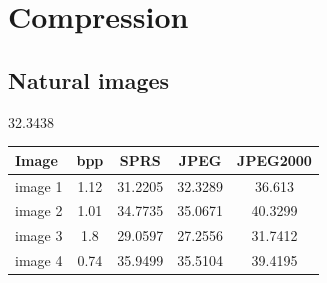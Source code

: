 \newpage
\section{Compression}
\subsection{Natural images}


32.3438

\begin{table}[H]
\centering
\begin{tabular}{| l c | c | c | c|}
\hline\hline
Image & bpp & SPRS & JPEG & JPEG2000 \\
\hline
image 1 & 1.12 & 31.2205 & 32.3289 & 36.613 \\
image 2 & 1.01 & 34.7735 & 35.0671 & 40.3299 \\
image 3 & 1.8  & 29.0597 & 27.2556 & 31.7412 \\
image 4 & 0.74  & 35.9499 & 35.5104 & 39.4195 \\

\hline
\end{tabular}
\end{table}

\begin{figure}[H]
\centering
{}
\hspace{5mm}
\hspace{5mm}
\end{figure}

